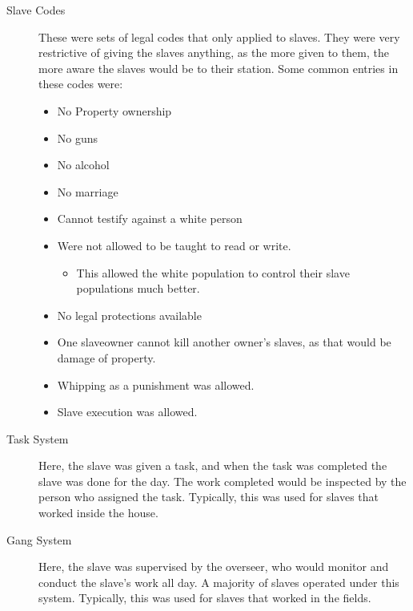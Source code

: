 \begin{description}
\item[Slave Codes] These were sets of legal codes that only applied to slaves.
  They were very restrictive of giving the slaves anything, as the more given to them, the more aware the slaves would be to their station.
  Some common entries in these codes were:
  \begin{itemize}[noitemsep]
  \item No Property ownership
  \item No guns
  \item No alcohol
  \item No marriage
  \item Cannot testify against a white person
  \item Were not allowed to be taught to read or write.
    \begin{itemize}[noitemsep]
    \item This allowed the white population to control their slave populations much better.
    \end{itemize}
  \item No legal protections available
  \item One slaveowner cannot kill another owner's slaves, as that would be damage of property.
  \item Whipping as a punishment was allowed.
  \item Slave execution was allowed.
  \end{itemize}

\item[Task System] Here, the slave was given a task, and when the task was completed the slave was done for the day.
  The work completed would be inspected by the person who assigned the task.
  Typically, this was used for slaves that worked inside the house.

\item[Gang System] Here, the slave was supervised by the overseer, who would monitor and conduct the slave's work all day.
  A majority of slaves operated under this system.
  Typically, this was used for slaves that worked in the fields.


\end{description}
